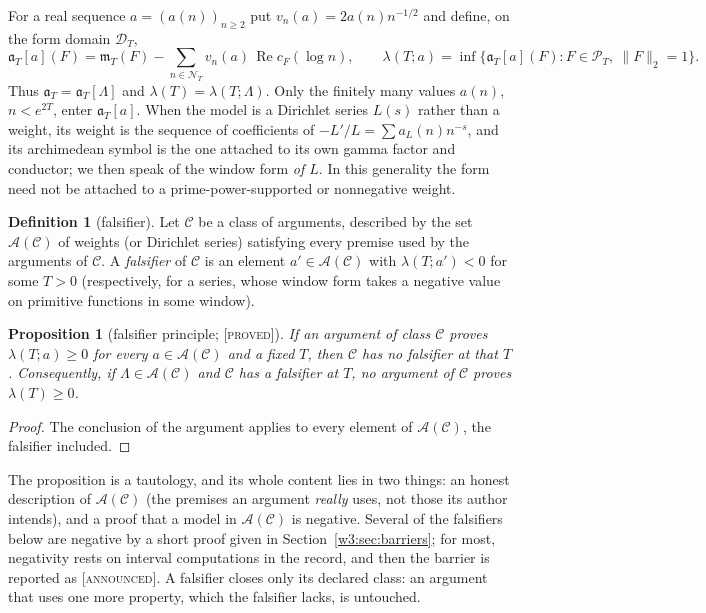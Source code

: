 \documentclass[11pt]{amsart}
\newtheorem{proposition}[theorem]{Proposition}
\theoremstyle{definition}
\newtheorem{definition}[theorem]{Definition}
\theoremstyle{remark}
\numberwithin{equation}{section}
\DeclareMathOperator{\Rel}{Re}
\newcommand{\cF}{c_F}                                  %
\newcommand{\PT}{\mathcal{P}_T}                        %
\newcommand{\DT}{\mathcal{D}_T}                        %
\newcommand{\NT}{\mathcal{N}_T}                        %
\newcommand{\mT}{\mathfrak{m}_T}                       %
\newcommand{\aT}{\mathfrak{a}_T}                       %
\newcommand{\lam}{\lambda(T)}                          %
\newcommand{\stag}[1]{\textsc{[#1]}}
\newcommand{\PROVED}{\stag{proved}}
\newcommand{\ANNOUNCED}{\stag{announced}}
\begin{document}
For a real sequence $a=(a(n))_{n\ge2}$ put $v_n(a)=2a(n)n^{-1/2}$ and define, on the form domain $\DT$,
\begin{equation}\label{w3:eq:aTa}
  \aT[a](F)=\mT(F)-\sum_{n\in\NT}v_n(a)\,\Rel\cF(\log n),
  \qquad
  \lambda(T;a)=\inf\{\aT[a](F):F\in\PT,\ \|F\|_2=1\}.
\end{equation}
Thus $\aT=\aT[\Lambda]$ and $\lam=\lambda(T;\Lambda)$. Only the finitely many values $a(n)$, $n<e^{2T}$, enter
$\aT[a]$. When the model is a Dirichlet series $L(s)$ rather than a weight, its weight is the sequence of
coefficients of $-L'/L=\sum a_L(n)n^{-s}$, and its archimedean symbol is the one attached to its own gamma
factor and conductor; we then speak of the window form \emph{of $L$}. In this generality the form need not be
attached to a prime-power-supported or nonnegative weight.

\begin{definition}[falsifier]\label{w3:def:falsifier}
Let $\mathcal C$ be a class of arguments, described by the set $\mathcal A(\mathcal C)$ of weights (or
Dirichlet series) satisfying every premise used by the arguments of $\mathcal C$. A \emph{falsifier} of
$\mathcal C$ is an element $a'\in\mathcal A(\mathcal C)$ with $\lambda(T;a')<0$ for some $T>0$ (respectively,
for a series, whose window form takes a negative value on primitive functions in some window).
\end{definition}

\begin{proposition}[falsifier principle; \PROVED]\label{w3:prop:principle}
If an argument of class $\mathcal C$ proves $\lambda(T;a)\ge0$ for every $a\in\mathcal A(\mathcal C)$ and a
fixed $T$, then $\mathcal C$ has no falsifier at that $T$. Consequently, if $\Lambda\in\mathcal A(\mathcal C)$
and $\mathcal C$ has a falsifier at $T$, no argument of $\mathcal C$ proves $\lam\ge0$.
\end{proposition}

\begin{proof}
The conclusion of the argument applies to every element of $\mathcal A(\mathcal C)$, the falsifier included.
\end{proof}

The proposition is a tautology, and its whole content lies in two things: an honest description of
$\mathcal A(\mathcal C)$ (the premises an argument \emph{really} uses, not those its author intends), and a
proof that a model in $\mathcal A(\mathcal C)$ is negative. Several of the falsifiers below are negative by a
short proof given in Section~\ref{w3:sec:barriers}; for most, negativity rests on interval computations in the
record, and then the barrier is reported as \ANNOUNCED. A falsifier closes only its declared class: an
argument that uses one more property, which the falsifier lacks, is untouched.
\end{document}
